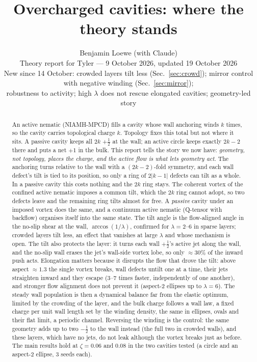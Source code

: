 \documentclass[11pt,a4paper]{article}
\title{Overcharged cavities: where the theory stands}
\author{Benjamin Loewe (with Claude)\\[2pt]\small Theory report for Tyler --- 9 October 2026, updated 19 October 2026\\
\small New since 14 October: crowded layers tilt less (Sec.~\ref{sec:crowd}); mirror control with negative winding (Sec.~\ref{sec:mirror});\\
\small robustness to activity; high $\lambda$ does not rescue elongated cavities; geometry-led story}
\date{}
\newcommand{\half}{\tfrac12}
\begin{document}
\maketitle

\begin{abstract}
\noindent
An active nematic (NIAMH-MPCD) fills a cavity whose wall anchoring winds $k$ times, so the cavity carries topological charge $k$. Topology fixes this total but not
where it sits. A passive cavity keeps all $2k$ $+\half$ at the wall; an active circle keeps exactly $2k-2$ there and puts a net $+1$ in the bulk. This report tells the
story we now have: \emph{geometry, not topology, places the charge, and the active flow is what lets geometry act}. The anchoring turns relative to the wall with a
$(2k-2)$-fold symmetry, and each wall defect's tilt is tied to its position, so only a ring of $2|k-1|$ defects can tilt as a whole. In a passive cavity this costs nothing
and the $2k$ ring stays. The coherent vortex of the confined active nematic imposes a common tilt, which the $2k$ ring cannot adopt, so two defects leave and the remaining
ring tilts almost for free. A \emph{passive} cavity under an imposed vortex does the same, and a continuum active nematic (Q-tensor with backflow) organises itself into the same
state. The tilt angle is the flow-aligned angle in the no-slip shear at the wall, $\arccos(1/\lambda)$, confirmed for $\lambda=2$--6 in sparse layers; crowded layers tilt less,
an effect that vanishes at large $\lambda$ and whose mechanism is open. The tilt also protects the layer: it turns each wall $+\half$'s active jet along the wall, and the no-slip
wall erases the jet's wall-side vortex lobe, so only $\approx30\%$ of the inward push acts. Elongation matters because it disrupts the flow that drove the tilt: above aspect
$\approx1.3$ the single vortex breaks, wall defects untilt one at a time, their jets straighten inward and they escape (3--7 times faster, independently of one another), and
stronger flow alignment does not prevent it (aspect-2 ellipses up to $\lambda=6$). The steady wall population is then a dynamical balance far from the elastic optimum, limited by the crowding of the layer,
and the bulk charge follows a wall law, a fixed charge per unit wall length set by the winding density, the same in ellipses, ovals and their flat limit, a periodic channel.
Reversing the winding is the control: the same geometry adds up to two $-\half$ to the wall instead (the full two in crowded walls), and these layers, which have no jets, do not leak although the vortex breaks
just as before. The main results hold at $\zeta=0.06$ and 0.08 in the two cavities tested (a circle and an aspect-2 ellipse, 3 seeds each).
\end{abstract}
\end{document}
